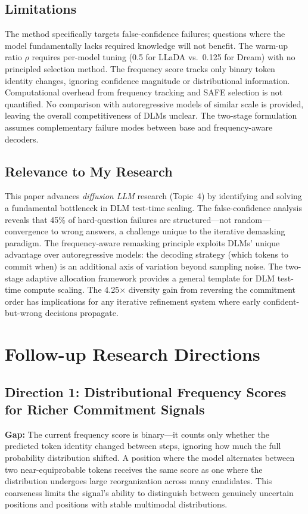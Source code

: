 \documentclass[11pt,a4paper]{article}
\begin{document}
\subsection{Limitations}
The method specifically targets false-confidence failures; questions where the model fundamentally lacks required knowledge will not benefit. The warm-up ratio $\rho$ requires per-model tuning (0.5 for LLaDA vs.\ 0.125 for Dream) with no principled selection method. The frequency score tracks only binary token identity changes, ignoring confidence magnitude or distributional information. Computational overhead from frequency tracking and SAFE selection is not quantified. No comparison with autoregressive models of similar scale is provided, leaving the overall competitiveness of DLMs unclear. The two-stage formulation assumes complementary failure modes between base and frequency-aware decoders.

\subsection{Relevance to My Research}
This paper advances \emph{diffusion LLM} research (Topic~4) by identifying and solving a fundamental bottleneck in DLM test-time scaling. The false-confidence analysis reveals that 45\% of hard-question failures are structured---not random---convergence to wrong answers, a challenge unique to the iterative demasking paradigm. The frequency-aware remasking principle exploits DLMs' unique advantage over autoregressive models: the decoding strategy (which tokens to commit when) is an additional axis of variation beyond sampling noise. The two-stage adaptive allocation framework provides a general template for DLM test-time compute scaling. The 4.25$\times$ diversity gain from reversing the commitment order has implications for any iterative refinement system where early confident-but-wrong decisions propagate.

\section{Follow-up Research Directions}

\subsection{Direction 1: Distributional Frequency Scores for Richer Commitment Signals}
\textbf{Gap:} The current frequency score is binary---it counts only whether the predicted token identity changed between steps, ignoring how much the full probability distribution shifted. A position where the model alternates between two near-equiprobable tokens receives the same score as one where the distribution undergoes large reorganization across many candidates. This coarseness limits the signal's ability to distinguish between genuinely uncertain positions and positions with stable multimodal distributions.
\end{document}
